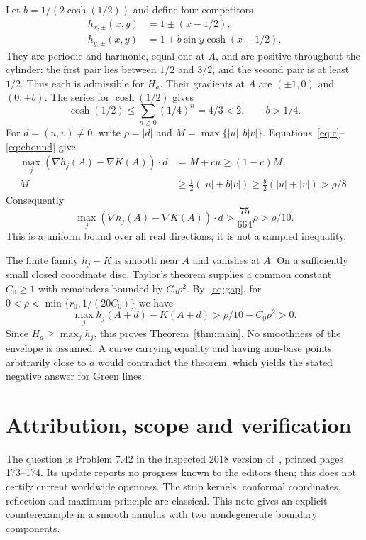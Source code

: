 \documentclass[11pt]{article}
\begin{document}
Let $b=1/(2\cosh(1/2))$ and define four competitors
\begin{align*}
 h_{x,\pm}(x,y)&=1\pm(x-1/2),\\
 h_{y,\pm}(x,y)&=1\pm b\sin y\cosh(x-1/2).
\end{align*}
They are periodic and harmonic, equal one at $A$, and are positive throughout the cylinder: the first pair lies between $1/2$ and $3/2$, and the second pair is at least $1/2$. Thus each is admissible for $H_a$. Their gradients at $A$ are $(\pm1,0)$ and $(0,\pm b)$. The series for $\cosh(1/2)$ gives
\[
 \cosh(1/2)\leq\sum_{n\geq0}(1/4)^n=4/3<2,
 \qquad b>1/4.
\]
For $d=(u,v)\ne0$, write $\rho=|d|$ and $M=\max\{|u|,b|v|\}$. Equations~\eqref{eq:c}--\eqref{eq:cbound} give
\begin{align*}
 \max_j (\nabla h_j(A)-\nabla K(A))\cdot d
 &=M+cu\geq(1-c)M,\\
 M&\geq\tfrac12(|u|+b|v|)
 \geq\tfrac b2(|u|+|v|)>\rho/8.
\end{align*}
Consequently
\begin{equation}\label{eq:gap}
 \max_j (\nabla h_j(A)-\nabla K(A))\cdot d
 >\frac{75}{664}\rho>\rho/10.
\end{equation}
This is a uniform bound over all real directions; it is not a sampled inequality.

The finite family $h_j-K$ is smooth near $A$ and vanishes at $A$. On a sufficiently small closed coordinate disc, Taylor's theorem supplies a common constant $C_0\geq1$ with remainders bounded by $C_0\rho^2$. By~\eqref{eq:gap}, for $0<\rho<\min\{r_0,1/(20C_0)\}$ we have
\[
 \max_j h_j(A+d)-K(A+d)>\rho/10-C_0\rho^2>0.
\]
Since $H_a\geq\max_jh_j$, this proves Theorem~\ref{thm:main}. No smoothness of the envelope is assumed. A curve carrying equality and having non-base points arbitrarily close to $a$ would contradict the theorem, which yields the stated negative answer for Green lines.

\section{Attribution, scope and verification}
The question is Problem 7.42 in the inspected 2018 version of~\cite{HL}, printed pages 173--174. Its update reports no progress known to the editors then; this does not certify current worldwide openness. The strip kernels, conformal coordinates, reflection and maximum principle are classical. This note gives an explicit counterexample in a smooth annulus with two nondegenerate boundary components.
\end{document}
